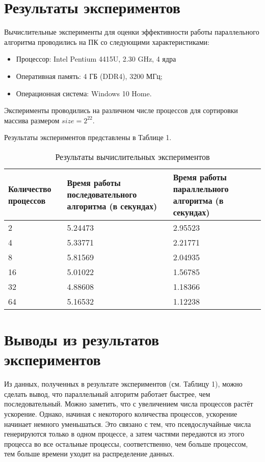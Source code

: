 \documentclass{report}
\begin{document}
\section*{Результаты экспериментов}
Вычислительные эксперименты для оценки эффективности работы параллельного алгоритма проводились на ПК со следующими характеристиками:
\begin{itemize}
\item Процессор: Intel Pentium 4415U, 2.30 GHz, 4 ядра
\item Оперативная память: 4 ГБ (DDR4), 3200 МГц;
\item Операционная система: Windows 10 Home.
\end{itemize}

\par Эксперименты проводились на различном числе процессов для сортировки массива размером $size=2^{22}$.

\par Результаты экспериментов представлены в Таблице 1.

\begin{table}[!h]
\caption{Результаты вычислительных экспериментов}
\centering
\begin{tabular}{| p{2cm} | p{3cm} | p{4cm} |}
\hline
Количество процессов & Время работы последовательного алгоритма (в секундах) & Время работы параллельного алгоритма (в секундах) \\[5pt]
\hline
2        &  5.24473       &  2.95523       \\
4        &  5.33771        & 2.21771    \\
8        &  5.81569     & 2.04935      \\
16        &  5.01022       &  1.56785       \\
32        &  4.88608       & 1.18366       \\
64        & 5.16532       & 1.12238    \\
\hline
\end{tabular}
\end{table}

\newpage

\section*{Выводы из результатов экспериментов}
Из данных, полученных в результате экспериментов (см. Таблицу 1), можно сделать вывод, что параллельный алгоритм работает быстрее, чем последовательный. Можно заметить, что с увеличением числа процессов растёт ускорение. Однако, начиная с некоторого количества процессов, ускорение начинает немного уменьшаться. Это связано с тем, что псевдослучайные числа генерируются только в одном процессе, а затем частями передаются из этого процесса во все остальные процессы, соответственно, чем больше процессом, тем больше времени уходит на распределение данных.
\newpage
\end{document}
